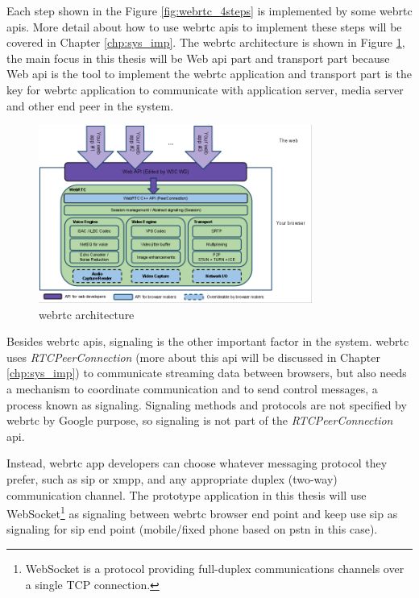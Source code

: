 \par Each step shown in the Figure \ref{fig:webrtc_4steps} is implemented by some \gls{webrtc} \gls{api}s. More detail about how to use \gls{webrtc} \gls{api}s to implement these steps will be covered in Chapter \ref{chp:sys_imp}. The \gls{webrtc} architecture is shown in Figure \ref{fig:webrtc_api_arch}, the main focus in this thesis will be Web \gls{api} part and transport part because Web \gls{api} is the tool to implement the \gls{webrtc} application and transport part is the key for \gls{webrtc} application to communicate with application server, media server and other end peer in the system. 

\begin{figure}
	\centering
    	\includegraphics[width=0.80\textwidth,natwidth=610,natheight=642]{figs/WebRTCapiPic.png}
  	\caption{\gls{webrtc} architecture \cite{org:webrtc}}
  	\label{fig:webrtc_api_arch}
\end{figure}

\par Besides \gls{webrtc} \gls{api}s, signaling is the other important factor in the system. \gls{webrtc} uses \textit{RTCPeerConnection} (more about this \gls{api} will be discussed in Chapter \ref{chp:sys_imp}) to communicate streaming data between browsers, but also needs a mechanism to coordinate communication and to send control messages, a process known as signaling. Signaling methods and protocols are not specified by \gls{webrtc} by Google purpose, so signaling is not part of the \textit{RTCPeerConnection} \gls{api}.

\par Instead, \gls{webrtc} app developers can choose whatever messaging protocol they prefer, such as \gls{sip} or \gls{xmpp}, and any appropriate duplex (two-way) communication channel. The prototype application in this thesis will use WebSocket\footnote{WebSocket is a protocol providing full-duplex communications channels over a single TCP connection.\cite{wiki:websocket}} as signaling between \gls{webrtc} browser end point and keep use \gls{sip} as signaling for \gls{sip} end point (mobile/fixed phone based on \gls{pstn} in this case).

